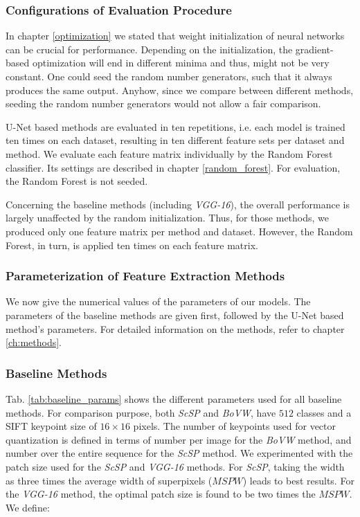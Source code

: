 \subsubsection{Configurations of Evaluation Procedure} \label{ch:eval_configs}
In chapter \ref{optimization} we stated that weight initialization of neural networks can be crucial for performance. Depending on the initialization, the gradient-based optimization will end in different minima and thus, might not be very constant. One could seed the random number generators, such that it always produces the same output. Anyhow, since we compare between different methods, seeding the random number generators would not allow a fair comparison.

U-Net based methods are evaluated in ten repetitions, i.e. each model is trained ten times on each dataset, resulting in ten different feature sets per dataset and method. We evaluate each feature matrix individually by the Random Forest classifier. Its settings are described in chapter \ref{random_forest}. For evaluation, the Random Forest is not seeded.

Concerning the baseline methods (including \textit{VGG-16}), the overall performance is largely unaffected by the random initialization. Thus, for those methods, we produced only one feature matrix per method and dataset. However, the Random Forest, in turn, is applied ten times on each feature matrix.

\subsubsection{Parameterization of Feature Extraction Methods}
We now give the numerical values of the parameters of our models. The parameters of the baseline methods are given first, followed by the U-Net based method's parameters. For detailed information on the methods, refer to chapter \ref{ch:methods}.

\subsubsection{Baseline Methods}
Tab. \ref{tab:baseline_params} shows the different parameters used for all baseline methods. For comparison purpose, both \textit{ScSP} and \textit{BoVW}, have $512$ classes and a SIFT keypoint size of $16 \times 16$ pixels. The number of keypoints used for vector quantization is defined in terms of number per image for the \textit{BoVW} method, and number over the entire sequence for the \textit{ScSP} method. We experimented with the patch size used for the \textit{ScSP} and \textit{VGG-16} methods. For \textit{ScSP}, taking the width as three times the average width of superpixels ($MSPW$) leads to best results. For the \textit{VGG-16} method, the optimal patch size is found to be two times the $MSPW$. We define:


